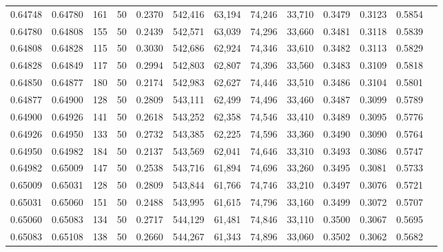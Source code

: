 \begin{tabular}{rrrrrrrrrrrrr}
0.64748 & 0.64780 &   161 &  50 &                                     0.2370 & 542,416 &  63,194 &  74,246 &  33,710 & 0.3479 & 0.3123 & 0.5854 \\
0.64780 & 0.64808 &   155 &  50 &                                     0.2439 & 542,571 &  63,039 &  74,296 &  33,660 & 0.3481 & 0.3118 & 0.5839 \\
0.64808 & 0.64828 &   115 &  50 &                                     0.3030 & 542,686 &  62,924 &  74,346 &  33,610 & 0.3482 & 0.3113 & 0.5829 \\
0.64828 & 0.64849 &   117 &  50 &                                     0.2994 & 542,803 &  62,807 &  74,396 &  33,560 & 0.3483 & 0.3109 & 0.5818 \\
0.64850 & 0.64877 &   180 &  50 &                                     0.2174 & 542,983 &  62,627 &  74,446 &  33,510 & 0.3486 & 0.3104 & 0.5801 \\
0.64877 & 0.64900 &   128 &  50 &                                     0.2809 & 543,111 &  62,499 &  74,496 &  33,460 & 0.3487 & 0.3099 & 0.5789 \\
0.64900 & 0.64926 &   141 &  50 &                                     0.2618 & 543,252 &  62,358 &  74,546 &  33,410 & 0.3489 & 0.3095 & 0.5776 \\
0.64926 & 0.64950 &   133 &  50 &                                     0.2732 & 543,385 &  62,225 &  74,596 &  33,360 & 0.3490 & 0.3090 & 0.5764 \\
0.64950 & 0.64982 &   184 &  50 &                                     0.2137 & 543,569 &  62,041 &  74,646 &  33,310 & 0.3493 & 0.3086 & 0.5747 \\
0.64982 & 0.65009 &   147 &  50 &                                     0.2538 & 543,716 &  61,894 &  74,696 &  33,260 & 0.3495 & 0.3081 & 0.5733 \\
0.65009 & 0.65031 &   128 &  50 &                                     0.2809 & 543,844 &  61,766 &  74,746 &  33,210 & 0.3497 & 0.3076 & 0.5721 \\
0.65031 & 0.65060 &   151 &  50 &                                     0.2488 & 543,995 &  61,615 &  74,796 &  33,160 & 0.3499 & 0.3072 & 0.5707 \\
0.65060 & 0.65083 &   134 &  50 &                                     0.2717 & 544,129 &  61,481 &  74,846 &  33,110 & 0.3500 & 0.3067 & 0.5695 \\
0.65083 & 0.65108 &   138 &  50 &                                     0.2660 & 544,267 &  61,343 &  74,896 &  33,060 & 0.3502 & 0.3062 & 0.5682 \\

\end{tabular}
